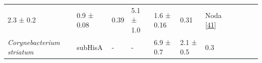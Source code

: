 \documentclass[12pt,twoside]{reedthesis}
\begin{document}
\begin{longtable}[]{@{}lllllllllll@{}}
\begin{minipage}[t]{0.06\columnwidth}
  2.3 ± 0.2\strut
  \end{minipage} & \begin{minipage}[t]{0.06\columnwidth}\raggedright\strut
  0.9 ± 0.08\strut
  \end{minipage} & \begin{minipage}[t]{0.06\columnwidth}\raggedright\strut
  0.39\strut
  \end{minipage} & \begin{minipage}[t]{0.05\columnwidth}\raggedright\strut
  5.1 ± 1.0\strut
  \end{minipage} & \begin{minipage}[t]{0.05\columnwidth}\raggedright\strut
  1.6 ± 0.16\strut
  \end{minipage} & \begin{minipage}[t]{0.03\columnwidth}\raggedright\strut
  0.31\strut
  \end{minipage} & \begin{minipage}[t]{0.11\columnwidth}\raggedright\strut
  Noda {[}\protect\hyperlink{ref-noda-garcia_evolution_2013}{41}{]}\strut
  \end{minipage}\tabularnewline
  \begin{minipage}[t]{0.15\columnwidth}\raggedright\strut
  \emph{Corynebacterium striatum}\strut
  \end{minipage} & \begin{minipage}[t]{0.05\columnwidth}\raggedright\strut
  subHisA\strut
  \end{minipage} & \begin{minipage}[t]{0.04\columnwidth}\raggedright\strut
  -\strut
  \end{minipage} & \begin{minipage}[t]{0.04\columnwidth}\raggedright\strut
  -\strut
  \end{minipage} & \begin{minipage}[t]{0.06\columnwidth}\raggedright\strut
  6.9 ± 0.7\strut
  \end{minipage} & \begin{minipage}[t]{0.06\columnwidth}\raggedright\strut
  2.1 ± 0.5\strut
  \end{minipage} & \begin{minipage}[t]{0.06\columnwidth}\raggedright\strut
  0.3\strut
  \end{minipage} & \begin{minipage}[t]{0.05\columnwidth}\raggedright\strut
  \strut
  \end{minipage} & \begin{minipage}[t]{0.05\columnwidth}\raggedright\strut

\end{minipage}
\end{longtable}
\end{document}
